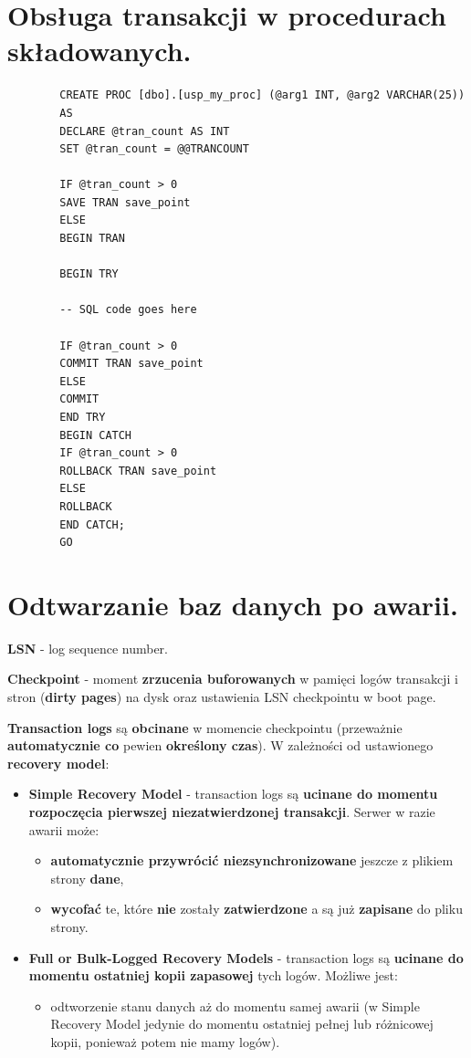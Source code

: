 \documentclass[a4paper]{article}
\begin{document}
    \section{Obsługa transakcji w procedurach składowanych.}
    \begin{verbatim}
        CREATE PROC [dbo].[usp_my_proc] (@arg1 INT, @arg2 VARCHAR(25))
        AS
        DECLARE @tran_count AS INT
        SET @tran_count = @@TRANCOUNT

        IF @tran_count > 0
        SAVE TRAN save_point
        ELSE
        BEGIN TRAN

        BEGIN TRY

        -- SQL code goes here

        IF @tran_count > 0
        COMMIT TRAN save_point
        ELSE
        COMMIT
        END TRY
        BEGIN CATCH
        IF @tran_count > 0
        ROLLBACK TRAN save_point
        ELSE
        ROLLBACK
        END CATCH;
        GO
    \end{verbatim}


    \section{Odtwarzanie baz danych po awarii.}
    \textbf{LSN} - log sequence number.

    \textbf{Checkpoint} - moment \textbf{zrzucenia buforowanych} w pamięci logów transakcji i stron (\textbf{dirty
    pages}) na dysk oraz ustawienia LSN checkpointu w boot page.

    \textbf{Transaction logs} są \textbf{obcinane} w momencie checkpointu (przeważnie \textbf{automatycznie co} pewien
    \textbf{określony czas}). W zależności od ustawionego \textbf{recovery model}:
    \begin{itemize}[noitemsep]
        \item \textbf{Simple Recovery Model} - transaction logs są \textbf{ucinane do momentu rozpoczęcia pierwszej
        niezatwierdzonej transakcji}. Serwer w razie awarii może:
        \begin{itemize}[noitemsep]
            \item \textbf{automatycznie przywrócić niezsynchronizowane} jeszcze z plikiem strony \textbf{dane},
            \item \textbf{wycofać} te, które \textbf{nie} zostały \textbf{zatwierdzone} a są już \textbf{zapisane} do
            pliku strony.
        \end{itemize}
        \item \textbf{Full or Bulk-Logged Recovery Models} - transaction logs są \textbf{ucinane do momentu ostatniej
        kopii zapasowej} tych logów. Możliwe jest:
        \begin{itemize}[noitemsep]
            \item odtworzenie stanu danych aż do momentu samej awarii (w Simple Recovery Model jedynie do momentu
            ostatniej pełnej lub różnicowej kopii, ponieważ potem nie mamy logów).
        \end{itemize}
    \end{itemize}
\end{document}
